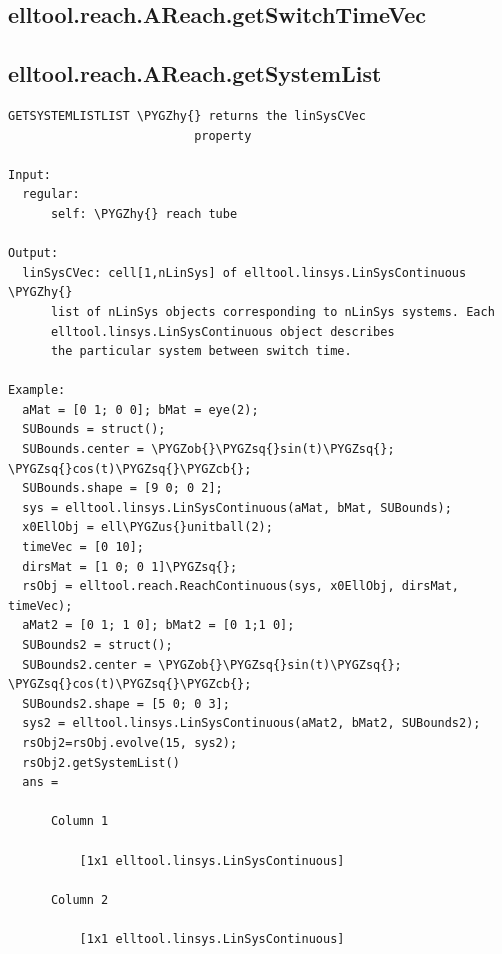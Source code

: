 \documentclass[letterpaper,10pt,english]{sphinxmanual}
\def\PYGZus{\char`\_}
\def\PYGZob{\char`\{}
\def\PYGZcb{\char`\}}
\def\PYGZhy{\char`\-}
\def\PYGZsq{\char`\'}
\begin{document}
\subsection{elltool.reach.AReach.getSwitchTimeVec}
\label{chap_functions:elltool-reach-areach-getswitchtimevec}

\subsection{elltool.reach.AReach.getSystemList}
\label{chap_functions:elltool-reach-areach-getsystemlist}
\begin{Verbatim}[commandchars=\\\{\}]
GETSYSTEMLISTLIST \PYGZhy{} returns the linSysCVec
                          property

Input:
  regular:
      self: \PYGZhy{} reach tube

Output:
  linSysCVec: cell[1,nLinSys] of elltool.linsys.LinSysContinuous \PYGZhy{}
      list of nLinSys objects corresponding to nLinSys systems. Each
      elltool.linsys.LinSysContinuous object describes
      the particular system between switch time.

Example:
  aMat = [0 1; 0 0]; bMat = eye(2);
  SUBounds = struct();
  SUBounds.center = \PYGZob{}\PYGZsq{}sin(t)\PYGZsq{}; \PYGZsq{}cos(t)\PYGZsq{}\PYGZcb{};
  SUBounds.shape = [9 0; 0 2];
  sys = elltool.linsys.LinSysContinuous(aMat, bMat, SUBounds);
  x0EllObj = ell\PYGZus{}unitball(2);
  timeVec = [0 10];
  dirsMat = [1 0; 0 1]\PYGZsq{};
  rsObj = elltool.reach.ReachContinuous(sys, x0EllObj, dirsMat, timeVec);
  aMat2 = [0 1; 1 0]; bMat2 = [0 1;1 0];
  SUBounds2 = struct();
  SUBounds2.center = \PYGZob{}\PYGZsq{}sin(t)\PYGZsq{}; \PYGZsq{}cos(t)\PYGZsq{}\PYGZcb{};
  SUBounds2.shape = [5 0; 0 3];
  sys2 = elltool.linsys.LinSysContinuous(aMat2, bMat2, SUBounds2);
  rsObj2=rsObj.evolve(15, sys2);
  rsObj2.getSystemList()
  ans =

      Column 1

          [1x1 elltool.linsys.LinSysContinuous]

      Column 2

          [1x1 elltool.linsys.LinSysContinuous]
\end{Verbatim}
\end{document}

